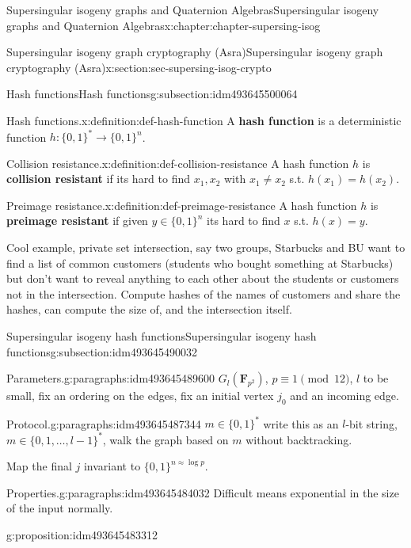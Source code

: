 \documentclass[oneside,10pt,]{book}
\newcommand{\terminology}[1]{\textbf{#1}}
\numberwithin{equation}{section}
\newcommand{\FF}{\mathbf{F}}
\begin{document}
\begin{chapterptx}{Supersingular isogeny graphs and Quaternion Algebras}{}{Supersingular isogeny graphs and Quaternion Algebras}{}{}{x:chapter:chapter-supersing-isog}
\begin{sectionptx}{Supersingular isogeny graph cryptography (Asra)}{}{Supersingular isogeny graph cryptography (Asra)}{}{}{x:section:sec-supersing-isog-crypto}
\begin{subsectionptx}{Hash functions}{}{Hash functions}{}{}{g:subsection:idm493645500064}
\begin{definition}{Hash functions.}{x:definition:def-hash-function}
A \terminology{hash function} is a deterministic function \(h\colon \{0,1\}^* \to \{0,1\}^n\).%
\end{definition}
\begin{definition}{Collision resistance.}{x:definition:def-collision-resistance}%
A hash function \(h\) is \terminology{collision resistant} if its hard to find \(x_1,x_2\) with \(x_1\ne x_2 \) s.t. \(h(x_1) = h(x_2)\).%
\end{definition}
\begin{definition}{Preimage resistance.}{x:definition:def-preimage-resistance}%
A hash function \(h\) is \terminology{preimage resistant} if given \(y\in \{0,1\}^n\) its hard to find \(x\) s.t. \(h(x) = y\).%
\end{definition}
Cool example, private set intersection, say two groups, Starbucks and BU want to find a list of common customers (students who bought something at Starbucks) but don't want to reveal anything to each other about the students or customers not in the intersection. Compute hashes of the names of customers and share the hashes, can compute the size of, and the intersection itself.%
\end{subsectionptx}
%
%
\typeout{************************************************}
\typeout{************************************************}
%
\begin{subsectionptx}{Supersingular isogeny hash functions}{}{Supersingular isogeny hash functions}{}{}{g:subsection:idm493645490032}
\begin{paragraphs}{Parameters.}{g:paragraphs:idm493645489600}%
\(G_l(\FF_{p^2})\), \(p \equiv 1 \pmod{12}\), \(l\) to be small, fix an ordering on the edges, fix an initial vertex \(j_0\) and an incoming edge.%
\end{paragraphs}%
\begin{paragraphs}{Protocol.}{g:paragraphs:idm493645487344}%
\(m \in \{0,1\}^*\) write this as an \(l\)-bit string, \(m \in \{0,1,\ldots, l-1\}^*\), walk the graph based on \(m\) without backtracking.%
\par
Map the final \(j\) invariant to  \(\{0,1\}^{n\approx \log p}\).%
\end{paragraphs}%
\begin{paragraphs}{Properties.}{g:paragraphs:idm493645484032}%
Difficult means exponential in the size of the input normally.%
\begin{proposition}{}{}{g:proposition:idm493645483312}%
%
\begin{enumerate}

\end{enumerate}
\end{proposition}
\end{paragraphs}
\end{subsectionptx}
\end{sectionptx}
\end{chapterptx}
\end{document}
